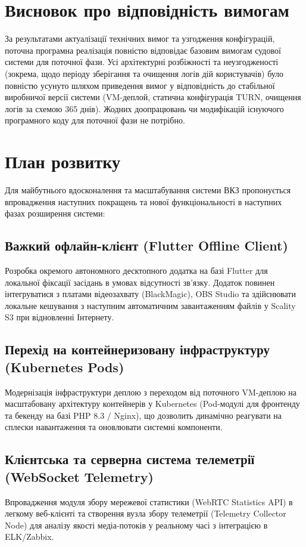 \documentclass{article}
\begin{document}
\newpage

\section{Висновок про відповідність вимогам}
За результатами актуалізації технічних вимог та узгодження конфігурацій, поточна програмна реалізація
повністю відповідає базовим вимогам судової системи для поточної фази. Усі архітектурні розбіжності
та неузгодженості (зокрема, щодо періоду зберігання та очищення логів дій користувачів) було повністю
усунуто шляхом приведення вимог у відповідність до стабільної виробничої версії системи (VM-деплой,
статична конфігурація TURN, очищення логів за схемою 365 днів). Жодних доопрацювань чи модифікацій
існуючого програмного коду для поточної фази не потрібно.

\section{План розвитку}
Для майбутнього вдосконалення та масштабування системи ВКЗ пропонується впровадження наступних покращень та
нової функціональності в наступних фазах розширення системи:

\subsection{Важкий офлайн-клієнт (Flutter Offline Client)}
Розробка окремого автономного десктопного додатка на базі Flutter для локальної фіксації засідань
в умовах відсутності зв'язку. Додаток повинен інтегруватися з платами відеозахвату (BlackMagic),
OBS Studio та здійснювати локальне кешування з наступним автоматичним завантаженням файлів у
Scality S3 при відновленні Інтернету.

\subsection{Перехід на контейнеризовану інфраструктуру (Kubernetes Pods)}
Модернізація інфраструктури деплою з переходом від поточного VM-деплою на масштабовану архітектуру
контейнерів у Kubernetes (Pod-модулі для фронтенду та бекенду на базі PHP 8.3 / Nginx), що дозволить
динамічно реагувати на сплески навантаження та оновлювати системні компоненти.

\subsection{Клієнтська та серверна система телеметрії (WebSocket Telemetry)}
Впровадження модуля збору мережевої статистики (WebRTC Statistics API) в легкому веб-клієнті та
створення вузла збору телеметрії (Telemetry Collector Node) для аналізу якості медіа-потоків у
реальному часі з інтеграцією в ELK/Zabbix.
\end{document}
